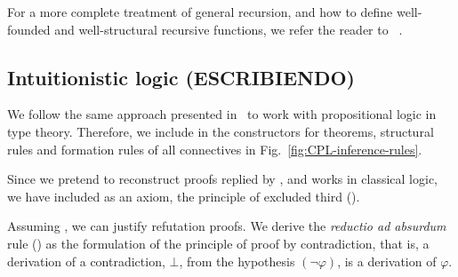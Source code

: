 \documentclass[../main.tex]{subfiles}
\begin{document}
For a more complete treatment of general recursion, and how to
define well-founded and well-structural recursive functions, we refer
the reader to \citeauthor{Bove2005}~\cite{Bove2005}.

\subsection{Intuitionistic logic (ESCRIBIENDO)}
\label{ssec:intuitionistic-logic}


We follow the same approach presented in~\cite{Altenkirch2015} to work with propositional
logic in type theory. Therefore, we include
in the constructors for theorems, structural rules and formation rules of 
all connectives in Fig.~\ref{fig:CPL-inference-rules}.

Since we pretend to reconstruct proofs replied by \Metis, and \Metis works
in classical logic,  we have included as an axiom, the 
principle of excluded third ().

Assuming , we can justify refutation proofs.
We derive the \emph{reductio ad absurdum} rule () as the
formulation of the principle of proof by contradiction, that is, a derivation
of a contradiction, $⊥$, from the hypothesis $(¬ φ)$, is a
derivation of $φ$.
\end{document}
